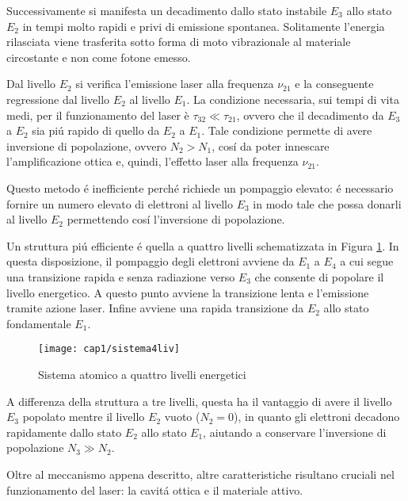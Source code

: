 Successivamente si manifesta un decadimento dallo stato instabile $E_3$ allo stato $E_2$ in tempi molto rapidi e privi di emissione spontanea. Solitamente l'energia rilasciata viene trasferita sotto forma di moto vibrazionale al materiale circostante e non come fotone emesso.

Dal livello $E_2$ si verifica l'emissione laser alla frequenza $\nu_{21}$ e la conseguente regressione dal livello $E_2$ al livello $E_1$. La condizione necessaria, sui tempi di vita medi, per il funzionamento del laser è $\tau_{32} \ll \tau_{21}$, ovvero che il decadimento da $E_3$ a $E_2$ sia pi\'u rapido di quello da $E_2$ a $E_1$. Tale condizione permette di avere inversione di popolazione, ovvero $N_2 > N_1$, cos\'i da poter innescare l'amplificazione ottica e, quindi, l'effetto laser alla frequenza $\nu_{21}$.

Questo metodo \'e inefficiente perch\'e richiede un pompaggio elevato: \'e necessario fornire un numero elevato di elettroni al livello $E_3$ in modo tale che possa donarli al livello $E_2$ permettendo cos\'i l'inversione di popolazione.

Un struttura pi\'u efficiente \'e quella a quattro livelli schematizzata in Figura \ref{sistema4liv}. In questa disposizione, il pompaggio degli elettroni avviene da $E_1$ a $E_4$ a cui segue una transizione rapida e senza radiazione verso $E_3$ che consente di popolare il livello energetico. A questo punto avviene la transizione lenta e l'emissione tramite azione laser. Infine avviene una rapida transizione da $E_2$ allo stato fondamentale $E_1$.

\begin{figure}[H]
	\begin{center}
		\texttt{[image: cap1/sistema4liv]}
		\caption{Sistema atomico a quattro livelli energetici}
		\label{sistema4liv}
	\end{center}
\end{figure}

A differenza della struttura a tre livelli, questa ha il vantaggio di avere il livello $E_3$ popolato mentre il livello $E_2$ vuoto ($N_2=0$), in quanto gli elettroni decadono rapidamente dallo stato $E_2$ allo stato $E_1$, aiutando a conservare l'inversione di popolazione $N_3 \gg N_2$. 
				
Oltre al meccanismo appena descritto, altre caratteristiche risultano cruciali nel funzionamento del laser: la cavit\'a ottica e il materiale attivo.

